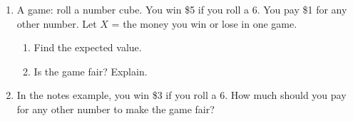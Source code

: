 \documentclass[11pt]{article}
\begin{document}
\begin{enumerate}
\begin{enumerate}[itemsep=1em]
\end{enumerate}
\work{2em}

\item A game: roll a number cube. You win \$5 if you roll a 6. You pay \$1 for any other number. Let $X$ = the money you win or lose in one game.
\begin{enumerate}[itemsep=1em]
  \item Find the expected value. 
  \work{2.5em}
  \item Is the game fair? Explain. 
\end{enumerate}
\work{2em}

\item In the notes example, you win \$3 if you roll a 6. How much should you pay for any other number to make the game fair?


\end{enumerate}
\end{document}
